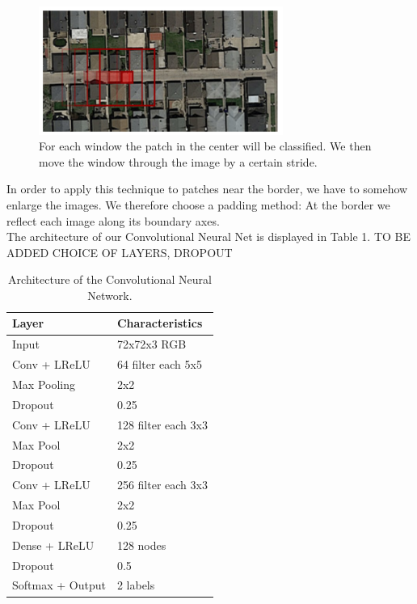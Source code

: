 \documentclass[10pt,conference,compsocconf]{IEEEtran}
\begin{document}
\begin{figure}[htbp]
	\centering
	\includegraphics[width=8cm]{images/slidingwindow.png}
	\caption{For each window the patch in the center will be classified. We then move the window through the image by a certain stride.}
	\vspace{-3mm}
	\label{fig:slidwindo}
\end{figure}

In order to apply this technique to patches near the border, we have to somehow enlarge the images. We therefore choose a padding method: At the border we reflect each image along its boundary axes.
\\
The architecture of our Convolutional Neural Net is displayed in Table 1. 
TO BE ADDED CHOICE OF LAYERS, DROPOUT

\begin{table}[htbp]
	\centering
	\begin{tabular}[c]{|l||l|}
		\hline
		\textbf{Layer}&\textbf{Characteristics}\\
		\hline
		Input&72x72x3 RGB\\
		Conv + LReLU &64 filter each 5x5\\
		Max Pooling&2x2\\		
		Dropout&0.25\\
		\hline
		Conv + LReLU &128 filter each 3x3\\
		Max Pool&2x2\\		
		Dropout&0.25\\
		\hline
		Conv + LReLU &256 filter each 3x3\\
		Max Pool&2x2\\		
		Dropout&0.25\\
		\hline
		Dense + LReLU &128 nodes\\
		Dropout&0.5\\		
		Softmax + Output&2 labels\\
		\hline
	\end{tabular}
	\caption{Architecture of the Convolutional Neural Network.}
	\label{tab:cnn_architecture}
\end{table}
\end{document}
